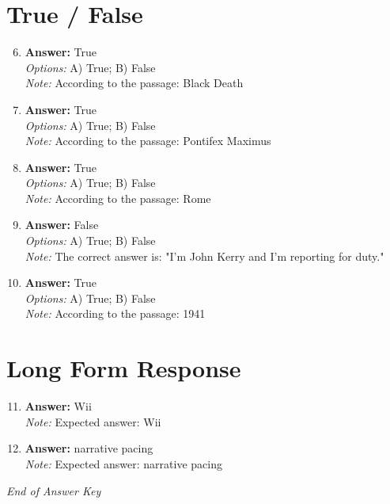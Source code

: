 \documentclass[12pt]{article}
\begin{document}
\section*{True / False}
\begin{enumerate}[label=\arabic*.]
\setcounter{enumi}{5}
\item \textbf{Answer:} True
\\ \textit{Options:} A) True; B) False
\\ \textit{Note:} According to the passage: Black Death
\item \textbf{Answer:} True
\\ \textit{Options:} A) True; B) False
\\ \textit{Note:} According to the passage: Pontifex Maximus
\item \textbf{Answer:} True
\\ \textit{Options:} A) True; B) False
\\ \textit{Note:} According to the passage: Rome
\item \textbf{Answer:} False
\\ \textit{Options:} A) True; B) False
\\ \textit{Note:} The correct answer is: "I'm John Kerry and I'm reporting for duty."
\item \textbf{Answer:} True
\\ \textit{Options:} A) True; B) False
\\ \textit{Note:} According to the passage: 1941
\end{enumerate}

\section*{Long Form Response}
\begin{enumerate}[label=\arabic*.]
\setcounter{enumi}{10}
\item \textbf{Answer:} Wii
\\ \textit{Note:} Expected answer: Wii
\item \textbf{Answer:} narrative pacing
\\ \textit{Note:} Expected answer: narrative pacing
\end{enumerate}

\vfill
\noindent\textit{End of Answer Key}
\end{document}

